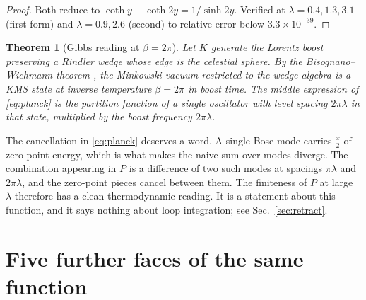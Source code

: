 \documentclass[12pt,a4paper]{article}
\theoremstyle{plain}
\newtheorem{theorem}{Theorem}[section]
\theoremstyle{definition}
\theoremstyle{remark}
\begin{document}
\begin{proof}
Both reduce to $\coth y-\coth2y=1/\sinh2y$. Verified at
$\lambda=0.4,1.3,3.1$ (first form) and $\lambda=0.9,2.6$ (second) to
relative error below $3.3\times10^{-39}$.
\end{proof}

\begin{theorem}[Gibbs reading at $\beta=2\pi$]
\label{thm:gibbs}
Let $K$ generate the Lorentz boost preserving a Rindler wedge whose
edge is the celestial sphere. By the Bisognano--Wichmann theorem
\cite{BW1975,BW1976}, the Minkowski vacuum restricted to the wedge
algebra is a KMS state at inverse temperature $\beta=2\pi$ in boost
time. The middle expression of \eqref{eq:planck} is the partition
function of a single oscillator with level spacing $2\pi\lambda$ in
that state, multiplied by the boost frequency $2\pi\lambda$.
\end{theorem}

The cancellation in \eqref{eq:planck} deserves a word. A single Bose
mode carries $\tfrac{x}{2}$ of zero-point energy, which is what makes
the naive sum over modes diverge. The combination appearing in $P$ is a
difference of two such modes at spacings $\pi\lambda$ and $2\pi\lambda$,
and the zero-point pieces cancel between them. The finiteness of $P$ at
large $\lambda$ therefore has a clean thermodynamic reading. It is a
statement about this function, and it says nothing about loop
integration; see Sec.~\ref{sec:retract}.

\section{Five further faces of the same function}
\end{document}
